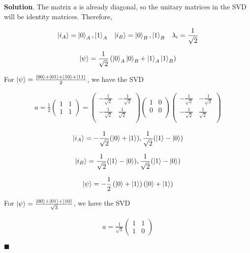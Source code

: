 \documentclass[12pt]{article}
\theoremstyle{definition}
\newenvironment{s}{%
        \begin{trivlist} \item \textbf{Solution}. }{%
            \hspace*{\fill} $\blacksquare$\end{trivlist}}%
\begin{document}
{\begin{s}
The matrix $a$ is already diagonal, so the unitary matrices in the SVD will be identity matrices. Therefore, 

\begin{align*}
\ket{i_{A}} = \ket{0}_{A}, \ket{1}_{A} \;\;\; \ket{i_{B}} = \ket{0}_{B}, \ket{1}_{B} \;\;\; \lambda_{i} = \frac{1}{\sqrt{2}}
\end{align*}


\begin{align*}
\ket{\psi} = \frac{1}{\sqrt{2}}\left(\ket{0}_{A}\ket{0}_{B} + \ket{1}_{A}\ket{1}_{B}\right)
\end{align*}

For $\ket{\psi} = \frac{\ket{00} + \ket{01} + \ket{10} + \ket{11}}{2}$, we have the SVD

\begin{align*}
a = \frac{1}{2}\begin{pmatrix}1 & 1\\ 1& 1\end{pmatrix} = \left(
\begin{array}{cc}
 -\frac{1}{\sqrt{2}} & -\frac{1}{\sqrt{2}} \\
 -\frac{1}{\sqrt{2}} & \frac{1}{\sqrt{2}} \\
\end{array}
\right)\left(
\begin{array}{cc}
 1 & 0 \\
 0 & 0 \\
\end{array}
\right)
\left(
\begin{array}{cc}
 -\frac{1}{\sqrt{2}} & -\frac{1}{\sqrt{2}} \\
 -\frac{1}{\sqrt{2}} & \frac{1}{\sqrt{2}} \\
\end{array}
\right)
\end{align*}

\begin{align*}
\ket{i_{A}} = -\frac{1}{\sqrt{2}}(\ket{0}+\ket{1}), \frac{1}{\sqrt{2}}(\ket{1} - \ket{0})
\end{align*}

\begin{align*}
\ket{i_{B}} = \frac{1}{\sqrt{2}}(\ket{1}-\ket{0}), \frac{1}{\sqrt{2}}(\ket{1} - \ket{0})
\end{align*}


\begin{align*}
\ket{\psi} = -\frac{1}{2}\left(\ket{0} + \ket{1}\right)\left(\ket{0} + \ket{1}\right)
\end{align*}


For $\ket{\psi} = \frac{\ket{00} + \ket{01} + \ket{10}}{\sqrt{3}}$, we have the SVD

\begin{align*}
a = \frac{1}{\sqrt{3}}\begin{pmatrix}1 & 1 \\ 1 & 0\end{pmatrix}
\end{align*}

\end{s}
\end{document}
